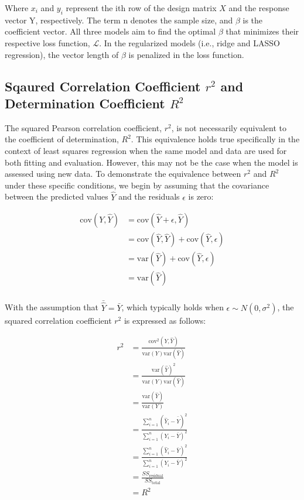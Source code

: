 Where $x_i$ and $y_i$ represent the ith row of the design matrix $X$ and the response vector Y, respectively. The term n denotes the sample size, and $\beta$ is the coefficient vector. All three models aim to find the optimal $\beta$ that minimizes their respective loss function, $\mathcal{L}$. In the regularized models (i.e., ridge and LASSO regression), the vector length of $\beta$ is penalized in the loss function.

\subsection*{Sqaured Correlation Coefficient $r^2$ and Determination Coefficient $R^2$}

The squared Pearson correlation coefficient, \( r^2 \), is not necessarily equivalent to the coefficient of determination, \( R^2 \). This equivalence holds true specifically in the context of least squares regression when the same model and data are used for both fitting and evaluation. However, this may not be the case when the model is assessed using new data. To demonstrate the equivalence between \( r^2 \) and \( R^2 \) under these specific conditions, we begin by assuming that the covariance between the predicted values \(\hat{Y}\) and the residuals \(\epsilon\) is zero:


\begin{equation} \label{eq_pf_cov}
    \begin{split}
        \text{cov}(Y, \hat{Y}) &= \text{cov}(\hat{Y} + \epsilon, \hat{Y}) \\
        &= \text{cov}(\hat{Y}, \hat{Y}) + \text{cov}(\hat{Y}, \epsilon) \\
        &= \text{var}(\hat{Y}) + \text{cov}(\hat{Y}, \epsilon) \\
        &= \text{var}(\hat{Y}) \\
    \end{split}
\end{equation}

With the assumption that \(\bar{\hat{Y}} = \bar{Y}\), which typically holds when \(\epsilon \sim N(0, \sigma^2)\), the squared correlation coefficient \( r^2 \) is expressed as follows:

\begin{equation} \label{eq_pf_r2}
    \begin{split}
        r^2 &= \frac{\text{cov}^2(Y, \hat{Y})}{\text{var}(Y)\text{var}(\hat{Y})} \\
        &= \frac{\text{var}(\hat{Y})^2}{\text{var}(Y)\text{var}(\hat{Y})} \\
        &= \frac{\text{var}(\hat{Y})}{\text{var}(Y)} \\
        &= \frac{\sum\limits_{i=1}^{n}(\hat{Y}_i - \bar{\hat{Y}})^2}{\sum\limits_{i=1}^{n}(Y_i - \bar{Y})^2} \\
        &= \frac{\sum\limits_{i=1}^{n}(\hat{Y}_i - \bar{Y})^2}{\sum\limits_{i=1}^{n}(Y_i - \bar{Y})^2} \\
        &= \frac{SS_{\text{residual}}}{SS_{\text{total}}} \\
        &= R^2
    \end{split}
\end{equation}

